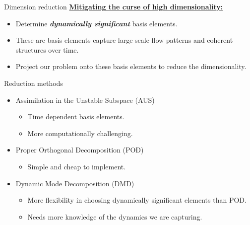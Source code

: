 \documentclass[aspectratio=169]{beamer}
\newcommand\boldgreen[1]{\textcolor{lighter_csu_green}{\emph{\textbf{#1}}}}
\begin{document}

\begin{frame}{Dimension reduction}
    \textbf{\underline{Mitigating the curse of high dimensionality:}}
    \begin{itemize}
        \item Determine \boldgreen{dynamically significant} basis elements. 
        \item These are basis elements capture large scale flow patterns and coherent structures over time.
        \item Project our problem onto these basis elements to reduce the dimensionality.
    \end{itemize}
\end{frame}


\begin{frame}{Reduction methods}
    \begin{itemize}
        \item Assimilation in the Unstable Subspace (AUS) 
        \begin{itemize}
            \item Time dependent basis elements.
            \item More computationally challenging.
        \end{itemize}
        \item Proper Orthogonal Decomposition (POD) 
        \begin{itemize}
            \item Simple and cheap to implement.
        \end{itemize}
        \item Dynamic Mode Decomposition (DMD) 
        \begin{itemize}
            \item More flexibility in choosing dynamically significant elements than POD.
            \item Needs more knowledge of the dynamics we are capturing.
        \end{itemize}
    \end{itemize}
\end{frame}

\end{document}
